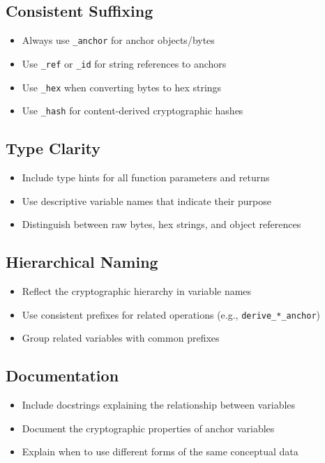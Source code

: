 \documentclass[12pt,a4paper]{article}
\begin{document}
\subsection{Consistent Suffixing}

\begin{itemize}
\item Always use \texttt{\_anchor} for anchor objects/bytes
\item Use \texttt{\_ref} or \texttt{\_id} for string references to anchors
\item Use \texttt{\_hex} when converting bytes to hex strings
\item Use \texttt{\_hash} for content-derived cryptographic hashes
\end{itemize}

\subsection{Type Clarity}

\begin{itemize}
\item Include type hints for all function parameters and returns
\item Use descriptive variable names that indicate their purpose
\item Distinguish between raw bytes, hex strings, and object references
\end{itemize}

\subsection{Hierarchical Naming}

\begin{itemize}
\item Reflect the cryptographic hierarchy in variable names
\item Use consistent prefixes for related operations (e.g., \texttt{derive\_*\_anchor})
\item Group related variables with common prefixes
\end{itemize}

\subsection{Documentation}

\begin{itemize}
\item Include docstrings explaining the relationship between variables
\item Document the cryptographic properties of anchor variables
\item Explain when to use different forms of the same conceptual data
\end{itemize}
\end{document}
